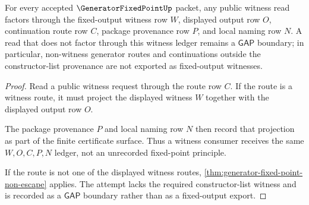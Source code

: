 \begin{theorem}
\label{thm:generator-fixed-point-witness-ledger-row}
For every accepted $\GeneratorFixedPointUp$ packet, any public witness read factors through the fixed-output witness row $W$, displayed output row $O$, continuation route row $C$, package provenance row $P$, and local naming row $N$. A read that does not factor through this witness ledger remains a $\mathsf{GAP}$ boundary; in particular, non-witness generator routes and continuations outside the constructor-list provenance are not exported as fixed-output witnesses.
\end{theorem}
\begin{proof}
Read a public witness request through the route row $C$. If the route is a witness route, it must project the displayed witness $W$ together with the displayed output row $O$.

The package provenance $P$ and local naming row $N$ then record that projection as part of the finite certificate surface. Thus a witness consumer receives the same $W,O,C,P,N$ ledger, not an unrecorded fixed-point principle.

If the route is not one of the displayed witness routes, \autoref{thm:generator-fixed-point-non-escape} applies. The attempt lacks the required constructor-list witness and is recorded as a $\mathsf{GAP}$ boundary rather than as a fixed-output export.
\end{proof}

